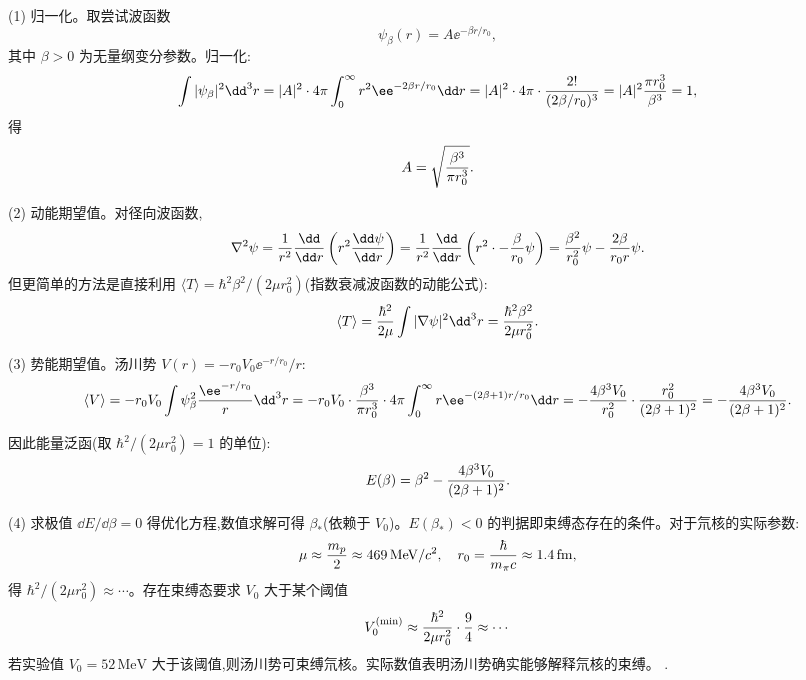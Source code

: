 \begin{solution}
(1) 归一化。取尝试波函数
\[
\psi_\beta(r)=A \ee^{-\beta r/r_0},
\]
其中 $\beta>0$ 为无量纲变分参数。归一化:
\[
\int|\psi_\beta|^2\dd^3r=|A|^2\cdot4\pi\int_0^\infty r^2 \ee^{-2\beta r/r_0}\dd r
=|A|^2\cdot4\pi\cdot{2!\over(2\beta/r_0)^3}
=|A|^2{\pi r_0^3\over\beta^3}=1,
\]
得
\[
A=\sqrt{\beta^3\over\pi r_0^3}.
\]

(2) 动能期望值。对径向波函数,
\[
\nabla^2\psi={1\over r^2}{\dd\over\dd r}\left(r^2{\dd\psi\over\dd r}\right)
={1\over r^2}{\dd\over\dd r}\left(r^2\cdot-{\beta\over r_0}\psi\right)
={\beta^2\over r_0^2}\psi-{2\beta\over r_0 r}\psi.
\]
但更简单的方法是直接利用 $\langle T\rangle=\hbar^2\beta^2/(2\mu r_0^2)$(指数衰减波函数的动能公式):
\[
\langle T\rangle={\hbar^2\over2\mu}\int|\nabla\psi|^2\dd^3r
={\hbar^2\beta^2\over2\mu r_0^2}.
\]

(3) 势能期望值。汤川势 $V(r)=-r_0V_0 \ee^{-r/r_0}/r$:
\[
\langle V\rangle
=-r_0V_0\int\psi_\beta^2{\ee^{-r/r_0}\over r}\dd^3r
=-r_0V_0\cdot{\beta^3\over\pi r_0^3}\cdot4\pi\int_0^\infty r \ee^{-(2\beta+1)r/r_0}\dd r
=-{4\beta^3V_0\over r_0^2}\cdot{r_0^2\over(2\beta+1)^2}
=-{4\beta^3V_0\over(2\beta+1)^2}.
\]

因此能量泛函(取 $\hbar^2/(2\mu r_0^2)=1$ 的单位):
\[
E(\beta)=\beta^2-{4\beta^3V_0\over(2\beta+1)^2}.
\]

(4) 求极值 $\dd E/\dd\beta=0$ 得优化方程,数值求解可得 $\beta_*$(依赖于 $V_0$)。$E(\beta_*)<0$ 的判据即束缚态存在的条件。对于氘核的实际参数:
\[
\mu\approx{m_p\over2}\approx469\,\mathrm{MeV}/c^2,\quad
r_0={\hbar\over m_\pi c}\approx1.4\,\mathrm{fm},
\]
得 $\hbar^2/(2\mu r_0^2)\approx\cdots$。存在束缚态要求 $V_0$ 大于某个阈值
\[
V_0^{\rm(min)}\approx{\hbar^2\over2\mu r_0^2}\cdot{9\over4}\approx\cdots
\]
若实验值 $V_0=52\,\mathrm{MeV}$ 大于该阈值,则汤川势可束缚氘核。实际数值表明汤川势确实能够解释氘核的束缚。
.
\end{solution}

